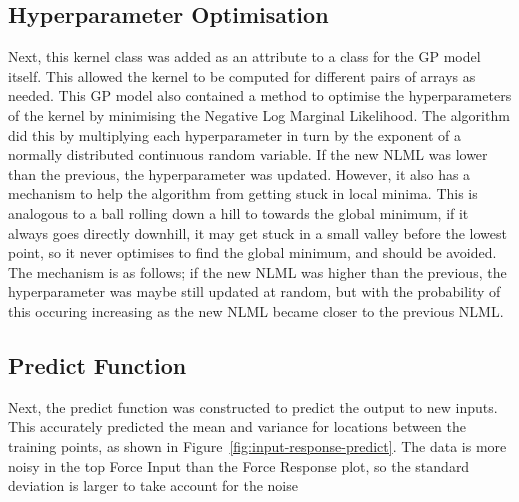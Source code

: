 \documentclass[12pt]{article}
\begin{document}
    \subsection{Hyperparameter Optimisation}
    Next, this kernel class was added as an attribute to a class for the GP model itself.
    This allowed the kernel to be computed for different pairs of arrays as needed.
    This GP model also contained a method to optimise the hyperparameters of the kernel by minimising the Negative Log Marginal Likelihood.
    The algorithm did this by multiplying each hyperparameter in turn by the exponent of a normally distributed continuous random variable.
    If the new NLML was lower than the previous, the hyperparameter was updated.
    However, it also has a mechanism to help the algorithm from getting stuck in local minima.
    This is analogous to a ball rolling down a hill to towards the global minimum, if it always goes directly downhill, it may get stuck in a small valley before the lowest point, so it never optimises to find the global minimum, and should be avoided.
    The mechanism is as follows; if the new NLML was higher than the previous, the hyperparameter was maybe still updated at random, but with the probability of this occuring increasing as the new NLML became closer to the previous NLML.

    \subsection{Predict Function}
    Next, the predict function was constructed to predict the output to new inputs.
    This accurately predicted the mean and variance for locations between the training points, as shown in Figure~\ref{fig:input-response-predict}.
    The data is more noisy in the top Force Input than the Force Response plot, so the standard deviation is larger to take account for the noise
\end{document}
